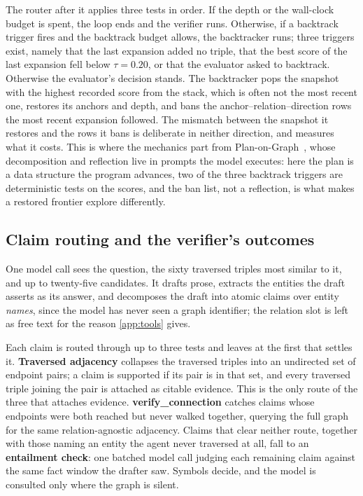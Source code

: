 The router after it applies three tests in order. If the depth or the
wall-clock budget is spent, the loop ends and the verifier runs.
Otherwise, if a backtrack trigger fires and the backtrack budget allows,
the backtracker runs; three triggers exist, namely that the last
expansion added no triple, that the best score of the last expansion
fell below $\tau = 0.20$, or that the evaluator asked to backtrack.
Otherwise the evaluator's decision stands. The backtracker pops the
snapshot with the highest recorded score from the stack, which is often
not the most recent one, restores its anchors and depth, and bans the
anchor--relation--direction rows the most recent expansion followed. The
mismatch between the snapshot it restores and the rows it bans is
deliberate in neither direction, and  measures what it
costs. This is where the mechanics part from
Plan-on-Graph~\cite{chen2024plan}, whose decomposition and reflection
live in prompts the model executes: here the plan is a data structure
the program advances, two of the three backtrack triggers are
deterministic tests on the scores, and the ban list, not a reflection,
is what makes a restored frontier explore differently.

\subsection{Claim routing and the verifier's outcomes}\label{app:claims}

One model call sees the question, the sixty traversed triples most
similar to it, and up to twenty-five candidates. It drafts prose,
extracts the entities the draft asserts as its answer, and decomposes
the draft into atomic claims over entity \emph{names}, since the model
has never seen a graph identifier; the relation slot is left as free
text for the reason \ref{app:tools} gives.

Each claim is routed through up to three tests and leaves at the first
that settles it. \textbf{Traversed adjacency} collapses the traversed
triples into an undirected set of endpoint pairs; a claim is supported
if its pair is in that set, and every traversed triple joining the pair
is attached as citable evidence. This is the only route of the three
that attaches evidence. \textbf{\textsf{verify\_connection}} catches
claims whose endpoints were both reached but never walked together,
querying the full graph for the same relation-agnostic adjacency. Claims
that clear neither route, together with those naming an entity the agent
never traversed at all, fall to an \textbf{entailment check}: one
batched model call judging each remaining claim against the same fact
window the drafter saw. Symbols decide, and the model is consulted only
where the graph is silent.

